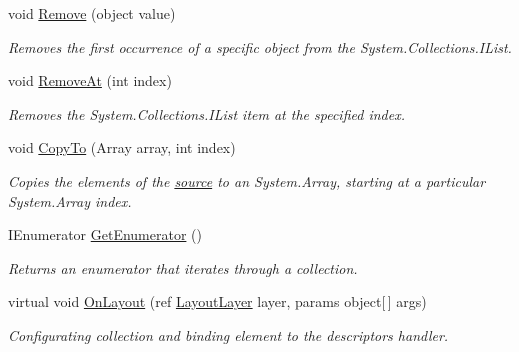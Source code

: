 \begin{DoxyCompactItemize}
void \mbox{\hyperlink{class_wpf_handler_1_1_u_i_1_1_controls_1_1_collection_control_acc5c3b3a95e4d58b6cda68e5f61089fd}{Remove}} (object value)
\begin{DoxyCompactList}\small\item\em Removes the first occurrence of a specific object from the System.\+Collections.\+I\+List. \end{DoxyCompactList}\item 
void \mbox{\hyperlink{class_wpf_handler_1_1_u_i_1_1_controls_1_1_collection_control_ab9ea70c06d17283a4e07195b0f9b0de7}{Remove\+At}} (int index)
\begin{DoxyCompactList}\small\item\em Removes the System.\+Collections.\+I\+List item at the specified index. \end{DoxyCompactList}\item 
void \mbox{\hyperlink{class_wpf_handler_1_1_u_i_1_1_controls_1_1_collection_control_a1cf65910d88b69192fd7dd764a63609a}{Copy\+To}} (Array array, int index)
\begin{DoxyCompactList}\small\item\em Copies the elements of the \mbox{\hyperlink{class_wpf_handler_1_1_u_i_1_1_controls_1_1_collection_control_a78ccfdc5208ab2306308d7356757f32f}{source}} to an System.\+Array, starting at a particular System.\+Array index. \end{DoxyCompactList}\item 
I\+Enumerator \mbox{\hyperlink{class_wpf_handler_1_1_u_i_1_1_controls_1_1_collection_control_a63509ef1e8df1c4901f3b83ff9473236}{Get\+Enumerator}} ()
\begin{DoxyCompactList}\small\item\em Returns an enumerator that iterates through a collection. \end{DoxyCompactList}\item 
virtual void \mbox{\hyperlink{class_wpf_handler_1_1_u_i_1_1_controls_1_1_collection_control_a54cf416fee122e600059ed8713d75bb0}{On\+Layout}} (ref \mbox{\hyperlink{class_wpf_handler_1_1_u_i_1_1_auto_layout_1_1_layout_layer}{Layout\+Layer}} layer, params object\mbox{[}$\,$\mbox{]} args)
\begin{DoxyCompactList}\small\item\em Configurating collection and binding element to the descriptors handler. \end{DoxyCompactList}\end{DoxyCompactItemize}
